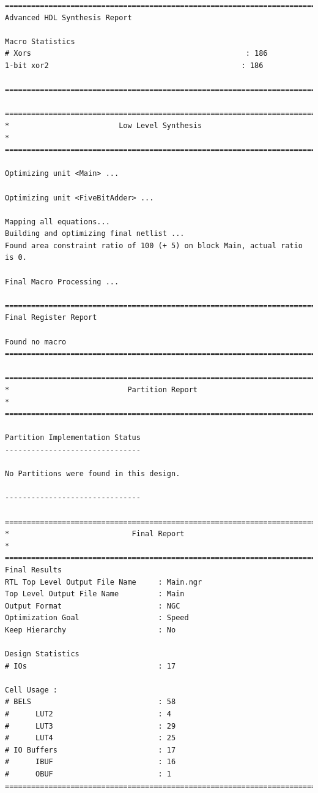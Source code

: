 \documentclass[fleqn]{article}
\begin{document}
\begin{latin}
\begin{lstlisting}[basicstyle=\tiny]
=========================================================================
Advanced HDL Synthesis Report

Macro Statistics
# Xors                                                 : 186
1-bit xor2                                            : 186

=========================================================================

=========================================================================
*                         Low Level Synthesis                           *
=========================================================================

Optimizing unit <Main> ...

Optimizing unit <FiveBitAdder> ...

Mapping all equations...
Building and optimizing final netlist ...
Found area constraint ratio of 100 (+ 5) on block Main, actual ratio is 0.

Final Macro Processing ...

=========================================================================
Final Register Report

Found no macro
=========================================================================

=========================================================================
*                           Partition Report                            *
=========================================================================

Partition Implementation Status
-------------------------------

No Partitions were found in this design.

-------------------------------

=========================================================================
*                            Final Report                               *
=========================================================================
Final Results
RTL Top Level Output File Name     : Main.ngr
Top Level Output File Name         : Main
Output Format                      : NGC
Optimization Goal                  : Speed
Keep Hierarchy                     : No

Design Statistics
# IOs                              : 17

Cell Usage :
# BELS                             : 58
#      LUT2                        : 4
#      LUT3                        : 29
#      LUT4                        : 25
# IO Buffers                       : 17
#      IBUF                        : 16
#      OBUF                        : 1
=========================================================================


\end{lstlisting}
\end{latin}
\end{document}
